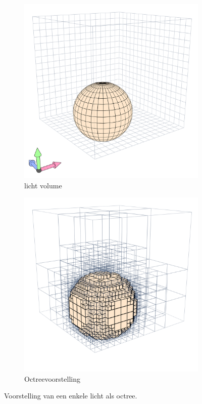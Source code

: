 \begin{figure}[t]
  \centering
  \begin{subfigure}[b]{.45\linewidth}
    \includegraphics[width=\textwidth]{./img/raw/hs-slt_left.png}%
    \caption{licht volume}%
    \label{fig:hs-slt-left}%
  \end{subfigure}
  \begin{subfigure}[b]{.45\linewidth}%
    \includegraphics[width=\textwidth]{./img/raw/hs-slt_right.png}%
    \caption{Octreevoorstelling}%
    \label{fig:hs-slt-right}%
  \end{subfigure}
  \caption{Voorstelling van een enkele licht als octree.}
  \label{fig:hs-licht-octree}
\end{figure}
